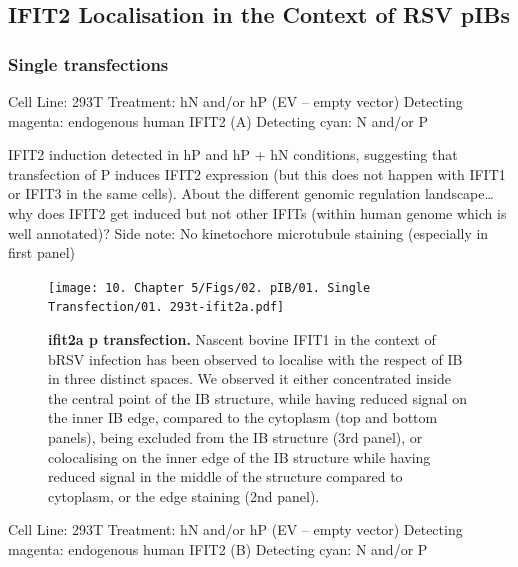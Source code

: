 \subsection{IFIT2 Localisation in the Context of RSV pIBs} \label{subsec:IFIT2 Localisation in the Context of RSV pIBs}
\subsubsection{Single transfections}
Cell Line: 293T \newline
Treatment: hN and/or hP (EV – empty vector) \newline
Detecting magenta: endogenous human IFIT2 (A) \newline
Detecting cyan: N and/or P \newline

IFIT2 induction detected in hP and hP + hN conditions, suggesting that transfection of P induces IFIT2 expression (but this does not happen with IFIT1 or IFIT3 in the same cells).
About the different genomic regulation landscape… why does IFIT2 get induced but not other IFITs (within human genome which is well annotated)? 
Side note: No kinetochore microtubule staining (especially in first panel)

\begin{figure}
    \centering
    \texttt{[image: 10. Chapter 5/Figs/02. pIB/01. Single Transfection/01. 293t-ifit2a.pdf]}
    \caption[ifit2a p transfection]{\textbf{ifit2a p transfection.} Nascent bovine IFIT1 in the context of bRSV infection has been observed to localise with the respect of IB in three distinct spaces. We observed it either concentrated inside the central point of the IB structure, while having reduced signal on the inner IB edge, compared to the cytoplasm (top and bottom panels), being excluded from the IB structure (3rd panel), or colocalising on the inner edge of the IB structure while having reduced signal in the middle of the structure compared to cytoplasm, or the edge staining (2nd panel).}
    \label{fig:ifit2a p transfection}
\end{figure}

Cell Line: 293T \newline
Treatment: hN and/or hP (EV – empty vector) \newline
Detecting magenta: endogenous human IFIT2 (B) \newline
Detecting cyan: N and/or P \newline


